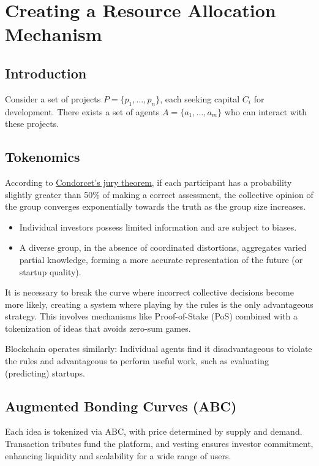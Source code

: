 \documentclass[12pt]{article}
\begin{document}
\section{Creating a Resource Allocation Mechanism}

\subsection{Introduction}
Consider a set of projects \( P = \{p_1, \dots, p_n \} \), each seeking capital \( C_i \) for development. There exists a set of agents \( A = \{a_1, \dots, a_m \} \) who can interact with these projects.

\subsection{Tokenomics}
According to \href{https://en.wikipedia.org/wiki/Condorcet%27s_jury_theorem}{Condorcet's jury theorem}, if each participant has a probability slightly greater than 50\% of making a correct assessment, the collective opinion of the group converges exponentially towards the truth as the group size increases.
\begin{itemize}
    \item Individual investors possess limited information and are subject to biases.
    \item A diverse group, in the absence of coordinated distortions, aggregates varied partial knowledge, forming a more accurate representation of the future (or startup quality).
\end{itemize}

It is necessary to break the curve where incorrect collective decisions become more likely, creating a system where playing by the rules is the only advantageous strategy. This involves mechanisms like Proof-of-Stake (PoS) combined with a tokenization of ideas that avoids zero-sum games.

Blockchain operates similarly: Individual agents find it disadvantageous to violate the rules and advantageous to perform useful work, such as evaluating (predicting) startups.

\subsection{Augmented Bonding Curves (ABC)}
Each idea is tokenized via ABC, with price determined by supply and demand. Transaction tributes fund the platform, and vesting ensures investor commitment, enhancing liquidity and scalability for a wide range of users.
\end{document}
